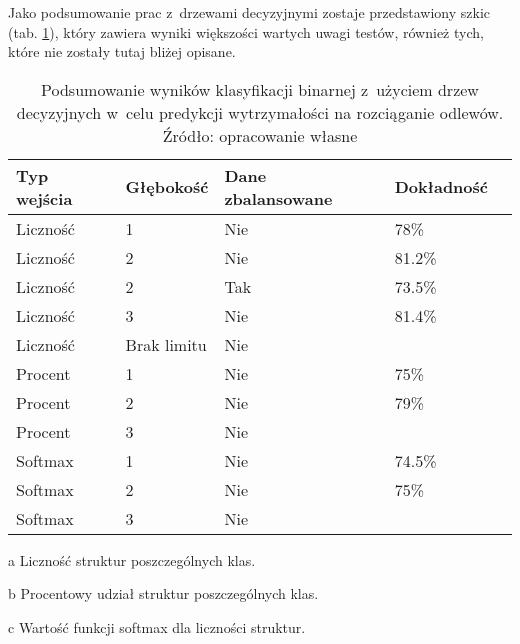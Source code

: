 Jako podsumowanie prac z~drzewami decyzyjnymi zostaje przedstawiony szkic (tab. \ref{dt.binary.summary.table}), który zawiera wyniki większości wartych uwagi testów, również tych, które nie zostały tutaj bliżej opisane.
\begin{table}[h]
	\centering
	\begin{threeparttable}
		\caption{Podsumowanie wyników klasyfikacji binarnej z~użyciem drzew decyzyjnych w~celu predykcji wytrzymałości na rozciąganie odlewów. Źródło: opracowanie własne}
		\label{dt.binary.summary.table}
		\begin{tabularx}{1\textwidth}{ |X|X|X|X|X| }
		  \hline
		  \textbf{Typ wejścia} & \textbf{Głębokość} & \textbf{Dane zbalansowane} & \textbf{Dokładność}\\

		  \hline
		  Liczność\tnote{a} & 1 & Nie  & 78\%\\

		  \hline
		   Liczność & 2 & Nie & 81.2\%\\

		  \hline
  		  Liczność & 2 & Tak & 73.5\%\\

		  \hline
		  Liczność & 3 & Nie & 81.4\%\\

		  \hline
		  Liczność & Brak limitu & Nie & \bo{84.3\%} \\

		\Xhline{1.5pt}
  		  Procent\tnote{b} & 1 & Nie & 75\%\\
  		  
		  \hline
  		  Procent & 2 & Nie & 79\%\\
  		  
		  \hline
  		  Procent & 3 & Nie   & \bo{80\%} \\

		\Xhline{1.5pt}
  		  Softmax\tnote{c} & 1 & Nie   & 74.5\%\\

		  \hline
  		  Softmax & 2 & Nie   & 75\% \\

		  \hline
  		  Softmax & 3 & Nie   & \bo{78\%} \\

		  \hline
		\end{tabularx}
		\begin{tablenotes}
			\footnotesize
			\item[a] Liczność struktur poszczególnych klas.
			\item[b] Procentowy udział struktur poszczególnych klas.
			\item[c] Wartość funkcji softmax dla liczności struktur.
		\end{tablenotes}
	\end{threeparttable}
\end{table}
